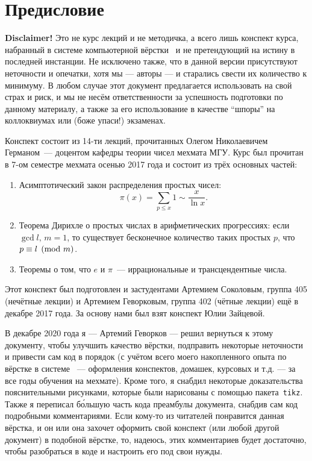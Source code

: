 

\section*{Предисловие}


\itshape

\textbf{Disclaimer!} Это не курс лекций и не методичка, а всего лишь конспект курса, набранный в системе компьютерной вёрстки \LaTeXe~и не претендующий на истину в последней инстанции. Не исключено также, что в данной версии присутствуют неточности и опечатки, хотя мы --- авторы --- и старались свести их количество к минимуму. В любом случае этот документ предлагается использовать на свой страх и риск, и мы не несём ответственности за успешность подготовки по данному материалу, а также за его использование в качестве ``шпоры'' на коллоквиумах или (боже упаси!) экзаменах.

Конспект состоит из 14-ти лекций, прочитанных Олегом Николаевичем Германом --- доцентом кафедры теории чисел мехмата МГУ. Курс был прочитан в 7-ом семестре мехмата осенью 2017 года и состоит из трёх основных частей:
\begin{enumerate}
    \item Асимптотический закон распределения простых чисел:
        \[
            \pi(x) = \sum_{p \le x} 1 \sim \frac{x}{\ln{x}}.
        \]
    \item Теорема Дирихле о простых числах в арифметических прогрессиях: если ${\gcd{l,\, m} = 1}$, то существует бесконечное количество таких простых $p$, что ${p \equiv l \pmod m}$.
    \item Теоремы о том, что $e$ и $\pi$ — иррациональные и трансцендентные числа.
\end{enumerate}

Этот конспект был подготовлен и за студентами Артемием Соколовым, группа 405 (нечётные лекции) и Артемием Геворковым, группа 402 (чётные лекции) ещё в декабре 2017 года. За основу нами был взят конспект Юлии Зайцевой.

В декабре 2020 года я --- Артемий Геворков --- решил вернуться к этому документу, чтобы улучшить качество вёрстки, подправить некоторые неточности и привести сам код в порядок (с учётом всего моего накопленного опыта по вёрстке в системе \LaTeXe~--- оформления конспектов, домашек, курсовых и т.д. --- за все годы обучения на мехмате). Кроме того, я снабдил некоторые доказательства пояснительными рисунками, которые были нарисованы с помощью пакета~\texttt{tikz}. Также я переписал б\'{о}льшую часть кода преамбулы документа, снабдив сам код подробными комментариями. Если кому-то из читателей понравится данная вёрстка, и он или она захочет оформить свой конспект (или любой другой документ) в подобной вёрстке, то, надеюсь, этих комментариев будет достаточно, чтобы разобраться в коде и настроить его под свои нужды.

